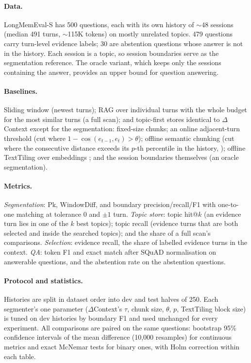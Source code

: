 \documentclass[11pt]{article}
\newcommand{\dc}{$\Delta$Context}
\begin{document}
\paragraph{Data.} LongMemEval-S \citep{wu2025longmemeval} has 500 questions,
each with its own history of $\sim$48 sessions (median 491 turns, $\sim$115K
tokens) on mostly unrelated topics. 479 questions carry turn-level evidence
labels; 30 are abstention questions whose answer is not in the history. Each
session is a topic, so session boundaries serve as the segmentation
reference. The oracle variant, which keeps only the sessions containing the
answer, provides an upper bound for question answering.

\paragraph{Baselines.} Sliding window (newest turns); RAG over individual turns
with the whole budget for the most similar turns (a full scan); and
topic-first stores identical to \dc{} except for the segmentation: fixed-size
chunks; an online adjacent-turn threshold (cut where
$1-\cos(e_{t-1},e_t) > \theta$); offline semantic chunking (cut where the
consecutive distance exceeds its $p$-th percentile in the history,
\citealp{langchain2024semanticchunker}); offline TextTiling over embeddings
\citep{hearst1997texttiling}; and the session boundaries themselves (an oracle
segmentation).

\paragraph{Metrics.} \emph{Segmentation}: Pk, WindowDiff, and boundary
precision/recall/F1 with one-to-one matching at tolerance 0 and $\pm 1$ turn.
\emph{Topic store}: topic hit@$k$ (an evidence turn lies in one of the $k$ best
topics); topic recall (evidence turns that are both selected and inside the
searched topics); and the share of a full scan's comparisons. \emph{Selection}:
evidence recall, the share of labelled evidence turns in the context.
\emph{QA}: token F1 and exact match after SQuAD normalisation
\citep{rajpurkar2016squad} on answerable questions, and the abstention rate on
the abstention questions.

\paragraph{Protocol and statistics.} Histories are split in dataset order into
dev and test halves of 250. Each segmenter's one parameter (\dc{}'s $\tau$,
chunk size, $\theta$, $p$, TextTiling block size) is tuned on dev histories by
boundary F1 and used unchanged for every experiment. All comparisons are paired
on the same questions: bootstrap 95\% confidence intervals of the mean
difference (10,000 resamples) \citep{efron1993bootstrap} for continuous
metrics and exact McNemar tests \citep{mcnemar1947note} for binary ones, with
Holm correction \citep{holm1979simple} within each table.
\end{document}
